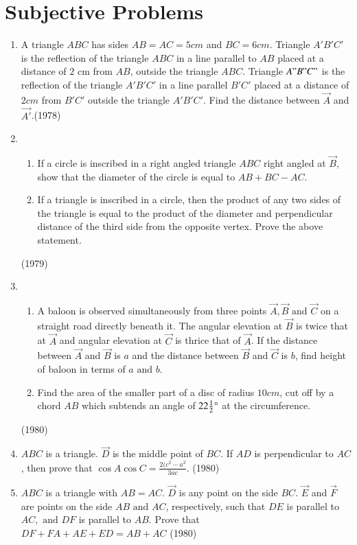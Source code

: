 \documentclass[journal,12pt,twocolumn]{IEEEtran}
\theoremstyle{remark}
\begin{document}
\section{Subjective Problems}

\begin{enumerate}
     \item A triangle $ABC$ has sides $AB=AC=5 cm$ and $BC =6 cm$. Triangle $A'B'C'$ is the reflection of the triangle $ABC$ in a line parallel to $AB$ placed at a distance of $2$ cm from $AB$, outside the triangle $ABC$. Triangle $A"B"C"$ is the reflection of the triangle $A'B'C'$ in a line parallel $B'C'$ placed at a distance of $2 cm$ from $B'C'$ outside the triangle $A'B'C'$. Find the distance between $\vec{A}$ and $\vec{A'}$.\hfill {(1978)}
    \item 
    \begin{enumerate}
	    \item If a circle is inscribed in a right angled triangle $ABC$ right angled at $\vec{B}$, show that the diameter of the circle is equal to $AB+BC-AC$.
    \item If a triangle is inscribed in a circle, then the product of any two sides of the triangle is equal to the product of the diameter and perpendicular distance of the third side from the opposite vertex. Prove the above statement.
    \end{enumerate}
    \hfill {(1979)}
    \item
    \begin{enumerate}
	\item A baloon is observed simultaneously from three points $\vec{A},\vec{B} \text{ and } \vec{C}$ on a straight road directly beneath it. The angular elevation at $\vec{B}$ is twice that at $\vec{A}$ and angular elevation at $\vec{C}$ is thrice that of $\vec{A}$. If the distance between $\vec{A}$ and $\vec{B}$ is $a$ and the distance between $\vec{B}$ and $\vec{C}$ is $b$, find height of baloon in terms of $a \text{ and } b$.
    \item Find the area of the smaller part of a disc of radius $10 cm$, cut off by a chord $AB$ which subtends an angle of $22\frac{1}{2} \degree$ at the circumference.
    \end{enumerate}
    \hfill {(1980)}
    \item $ABC$ is a triangle. $\vec{D}$ is the middle point of $BC$. If $AD$ is perpendicular to $AC$, then prove that $\cos{A}\cos{C} = \frac{2(c^{2}-a^{2}}{3ac}$.
    \hfill {(1980)}
    \item $ABC$ is a triangle with $AB=AC$. $\vec{D}$ is any point on the side $BC$. $\vec{E}$ and $\vec{F}$ are points on the side $AB \text{ and } AC$, respectively, such that $DE$ is parallel to $AC, \text{ and } DF$ is parallel to $AB$. Prove that \\
    $DF + FA + AE + ED = AB+AC$
    \hfill {(1980)} 
\end{enumerate}
\end{document}
